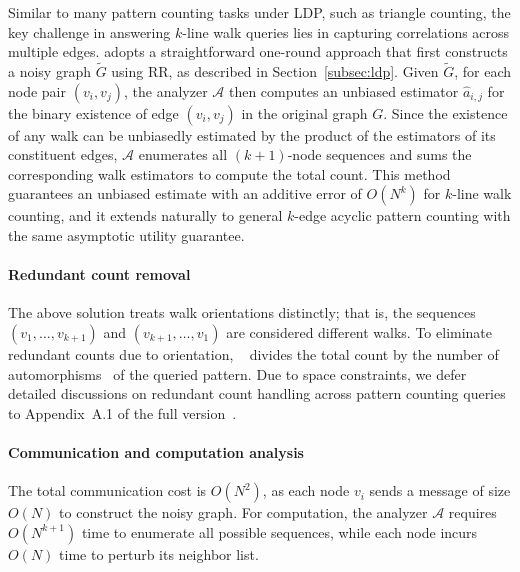 Similar to many pattern counting tasks under LDP, such as triangle counting, the key challenge in answering $k$-line walk queries lies in capturing correlations across multiple edges. 
{\cite{suppakitpaisarn2025counting} adopts a straightforward one-round approach that first constructs a noisy graph $\tilde{G}$ using RR, as described in Section~\ref{subsec:ldp}.
Given $\tilde{G}$, for each node pair $(v_i, v_j)$, the analyzer $\mathcal{A}$ then computes an unbiased estimator $\hat{a}_{i,j}$ for the binary existence of edge $(v_i, v_j)$ in the original graph $G$.
Since the existence of any walk can be unbiasedly estimated by the product of the estimators of its constituent edges, $\mathcal{A}$ enumerates all $(k+1)$-node sequences and sums the corresponding walk estimators to compute the total count.
This method guarantees an unbiased estimate with an additive error of $O(N^k)$ for $k$-line walk counting, and it extends naturally to general $k$-edge acyclic pattern counting with the same asymptotic utility guarantee.
}




\paragraph{Redundant count removal}
The above solution treats walk orientations distinctly; that is, the sequences $(v_1, \dots, v_{k+1})$ and $(v_{k+1}, \dots, v_1)$ are considered different walks. 
{To eliminate redundant counts due to orientation, ~\cite{suppakitpaisarn2025counting} divides the total count by the number of automorphisms~\cite{godsil2013algebraic} of the queried pattern.}
{Due to space constraints, we defer detailed discussions on redundant count handling across pattern counting queries to Appendix~{A.1} of the full version~\cite{full_version}.}





\paragraph{Communication and computation analysis}
The total communication cost is $O(N^2)$, as each node $v_i$ sends a message of size $O(N)$ to construct the noisy graph. 
For computation, the analyzer $\mathcal{A}$ requires $O(N^{k+1})$ time to enumerate
all possible sequences,
while each node incurs $O(N)$ time to perturb its neighbor list.





